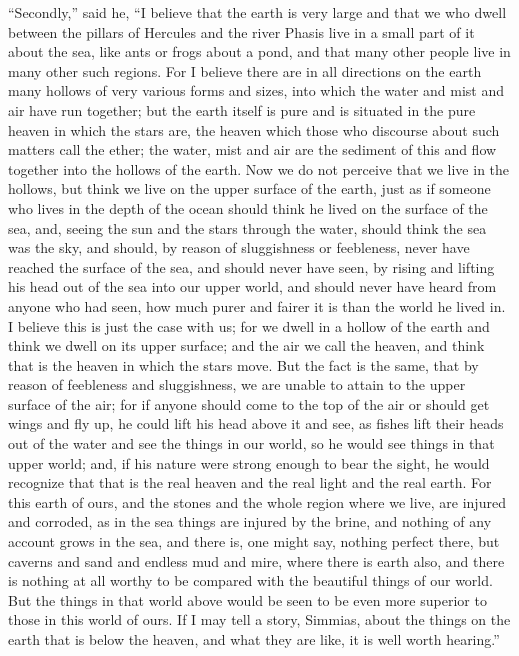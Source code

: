 \documentclass[letterpaper,12pt]{article}
\newcommand{\stephpag}[1]{\marginnote{\small\itshape\fontfamily{ppl}\selectfont #1}}
\begin{document}
\begin{drama}
``Secondly,'' said he, ``I believe that the earth is very large and that we who dwell between the pillars of Hercules \stephpag{b} and the river Phasis live in a small part of it about the sea, like ants or frogs about a pond, and that many other people live in many other such regions. For I believe there are in all directions on the earth many hollows of very various forms and sizes, into which the water and mist and air have run together; but the earth itself is pure and is situated in the pure heaven in which the stars are, the heaven which \stephpag{c} those who discourse about such matters call the ether; the water, mist and air are the sediment of this and flow together into the hollows of the earth. Now we do not perceive that we live in the hollows, but think we live on the upper surface of the earth, just as if someone who lives in the depth of the ocean should think he lived on the surface of the sea, and, seeing the sun and the stars through the water, should think the sea was the sky, and should, by reason of sluggishness or \stephpag{d} feebleness, never have reached the surface of the sea, and should never have seen, by rising and lifting his head out of the sea into our upper world, and should never have heard from anyone who had seen, how much purer and fairer it is than the world he lived in. I believe this is just the case with us; for we dwell in a hollow of the earth and think we dwell on its upper surface; and the air we call the heaven, and think that is the heaven in which the stars move. But the fact is the same, \stephpag{e} that by reason of feebleness and sluggishness, we are unable to attain to the upper surface of the air; for if anyone should come to the top of the air or should get wings and fly up, he could lift his head above it and see, as fishes lift their heads out of the water and see the things in our world, so he would see things in that upper world; and, if his nature were strong enough to bear the sight, he would recognize that that is the real heaven \stephpag{110 a} and the real light and the real earth. For this earth of ours, and the stones and the whole region where we live, are injured and corroded, as in the sea things are injured by the brine, and nothing of any account grows in the sea, and there is, one might say, nothing perfect there, but caverns and sand and endless mud and mire, where there is earth also, and there is nothing at all worthy to be compared with the beautiful things of our world. But the things in that world above would be seen to be even more superior to those in this world of ours. \stephpag{b} If I may tell a story, Simmias, about the things on the earth that is below the heaven, and what they are like, it is well worth hearing.''
 

\end{drama}
\end{document}

